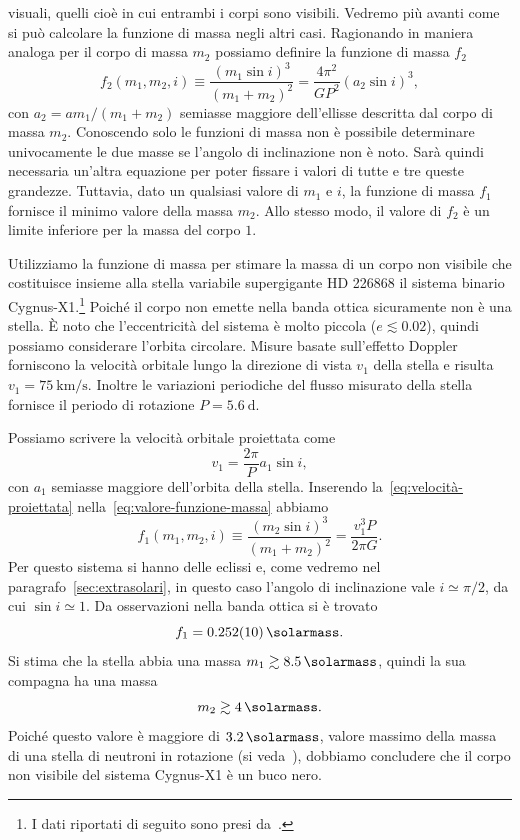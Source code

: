 visuali, quelli cioè in cui entrambi i corpi sono visibili. Vedremo più avanti
come si può calcolare la funzione di massa negli altri casi. Ragionando in
maniera analoga per il corpo di massa $m_2$ possiamo definire la funzione di
massa $f_2$
\begin{equation}
  f_2(m_1,m_2,i) \equiv \frac{(m_1\sin i)^3}{(m_1 + m_2)^2} =
  \frac{4\pi^2}{GP^2}(a_2\sin i)^3,
\end{equation}
con $a_2 = am_1/(m_1+m_2)$ semiasse maggiore dell'ellisse descritta dal corpo di
massa $m_2$. Conoscendo solo le funzioni di massa non è possibile determinare
univocamente le due masse se l'angolo di inclinazione non è noto. Sarà quindi
necessaria un'altra equazione per poter fissare i valori di tutte e tre queste
grandezze. Tuttavia, dato un qualsiasi valore di $m_1$ e $i$, la funzione di
massa $f_1$ fornisce il minimo valore della massa $m_2$. Allo stesso modo, il
valore di $f_2$ è un limite inferiore per la massa del corpo $1$.

Utilizziamo la funzione di massa per stimare la massa di un corpo non visibile
che costituisce insieme alla stella variabile supergigante HD 226868 il sistema
binario
Cygnus-X1.\footnote{I dati riportati di seguito sono presi
  da~\textcite[212]{melia:astrophysics}.} Poiché il corpo non emette nella banda
ottica sicuramente non è una stella. È noto che l'eccentricità del sistema è
molto piccola ($e \lesssim 0.02$), quindi possiamo considerare l'orbita
circolare. Misure basate sull'effetto Doppler forniscono la velocità orbitale
lungo la direzione di vista $v_1$ della stella e risulta $v_1 =
\SI{75}{\kilo\metre\per\second}$. Inoltre le variazioni periodiche del flusso
misurato della stella fornisce il periodo di rotazione $P = \SI{5.6}{\day}$.

Possiamo scrivere la velocità orbitale proiettata come
\begin{equation}
  \label{eq:velocità-proiettata}
  v_1 = \frac{2\pi}{P}a_1\sin i,
\end{equation}
con $a_1$ semiasse maggiore dell'orbita della stella. Inserendo
la~\eqref{eq:velocità-proiettata} nella~\eqref{eq:valore-funzione-massa} abbiamo
\begin{equation}
  f_1(m_1,m_2,i) \equiv \frac{(m_2\sin i)^3}{(m_1 + m_2)^2} = \frac{v_1^3P}{2\pi
    G}.
\end{equation}
Per questo sistema si hanno delle eclissi e, come vedremo nel
paragrafo~\ref{sec:extrasolari}, in questo caso l'angolo di inclinazione vale
$i \simeq \pi/2$, da cui $\sin i \simeq 1$. Da osservazioni nella banda ottica
si è trovato
\begin{equation}
  f_1 = \SI{0.252(10)}{\solarmass}.
\end{equation}
Si stima che la stella abbia una massa $m_1 \gtrsim \SI{8.5}{\solarmass}$,
quindi la sua compagna ha una massa
\begin{equation}
  m_2 \gtrsim \SI{4}{\solarmass}.
\end{equation}
Poiché questo valore è maggiore di $\SI{3.2}{\solarmass}$, valore massimo della
massa di una stella di neutroni in rotazione (si
veda~\textcite{1974PhRvL..32..324R}), dobbiamo concludere che il corpo non
visibile del sistema Cygnus-X1 è un buco nero.

